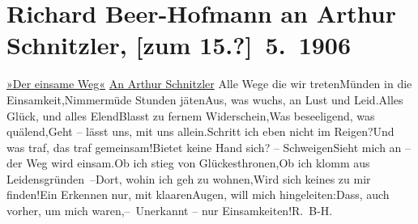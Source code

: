 

               \section[Richard Beer-Hofmann an Arthur Schnitzler, {[}zum 15.?{]} 5. 1906]{ Richard Beer-Hofmann an Arthur Schnitzler, {[}zum
               15.?{]} 5. 1906}\nopagebreak{}\rehead{ }\begin{ledgroupsized}[t]{13cm}\normalsize\beginnumbering{} \toendnotes[C]{\smallbreak\pagebreak[2]} 
\toendnotes[C]{\smallbreak}\pstart
           \noindent{}\centering{}{\pb}\uline{»Der
                     einsame Weg«}\pend
           \pstart
           \noindent{}\raggedleft{}\uline{An Arthur Schnitzler}\pend
           \stanza{}Alle Wege die wir treten\newverse{}Münden in die Einsamkeit,\newverse{}Nimmermüde Stunden jäten\newverse{}Aus, was wuchs, an Lust und Leid.\newverse{}\newverse{}Alles Glück, und alles Elend\newverse{}Blasst zu fernem Widerschein,\newverse{}Was beseeligend, was quälend,\newverse{}Geht – lässt uns, mit uns allein.\newverse{}\newverse{}Schritt ich eben nicht im Reigen?\newverse{}Und was traf, das traf gemeinsam!\newverse{}Bietet keine Hand sich? – Schweigen\newverse{}Sieht mich an – der Weg wird einsam.\newverse{}\newverse{}Ob ich stieg von Glückesthronen,\newverse{}Ob ich klomm aus Leidensgründen –\newverse{}Dort, wohin ich geh zu wohnen,\newverse{}Wird sich keines zu mir finden!\newverse{}\newverse{}Ein Erkennen nur, mit klaaren\newverse{}Augen, will mich hingeleiten:\newverse{}Dass, auch vorher, um mich waren,\newverse{}– Unerkannt – nur Einsamkeiten!\stanzaend{}\pstart \spacefill\mbox{R. B-H.}\pend{}\pstart

\end{ledgroupsized}
